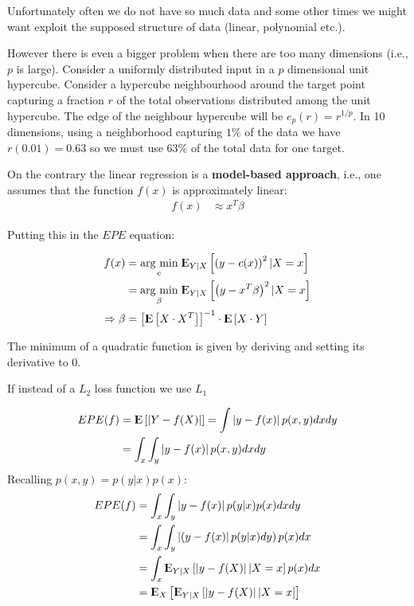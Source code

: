 \documentclass[12pt, letterpaper]{article}
\theoremstyle{definition}
\newcommand{\E}{{\rm I\kern-.3em E}}
\newcommand{\argmin}[1]{\underset{#1}{\operatorname{arg}\,\operatorname{min}}\;}
\begin{document}
Unfortunately often we do not have so much data and some other times we might want exploit the supposed structure of data (linear, polynomial etc.).

However there is even a bigger problem when there are too many dimensions (i.e., $p$ is large). Consider a uniformly distributed input in a $p$ dimensional unit hypercube. Consider a hypercube neighbourhood around the target point capturing a fraction $r$ of the total observations distributed among the unit hypercube. The edge of the neighbour hypercube will be $e_p(r) = r^{1/p}$. In 10 dimensions, using a neighborhood capturing $1\%$ of the data we have $r(0.01) = 0.63$ so we must use 63\% of the total data for one target.

On the contrary the linear regression is a \textbf{model-based approach}, i.e., one assumes that the function $f(x)$ is approximately linear:
\begin{align}
f(x) &\approx x^T \beta
\end{align}

Putting this in the $EPE$ equation:

\begin{equation}
\begin{aligned}
f(x) &= \argmin{c} \E_{Y|X} \left[ \left( y - c(x) \right)^2 | X=x \right]  \\
&= \argmin{\beta} \E_{Y|X} \left[ \left( y - x^T \beta \right)^2 | X=x \right] \\
\Rightarrow \beta &= \left[ \E\left[ X\cdot X ^T\right]\right]^{-1} \cdot \E\left[ X\cdot Y \right]
\end{aligned}
\end{equation}

The minimum of a quadratic function is given by deriving and setting its derivative to $0$.

If instead of a $L_2$ loss function we use $L_1$

\begin{equation}
\begin{aligned}
EPE(f) &= \E\left[ \left| Y- f(X) \right| \right] = \int \left| y- f(x) \right| p(x,y) dx dy \\
&= \int_x\int_y \left| y- f(x) \right|p(x,y) dx dy \\
\end{aligned}
\end{equation}
Recalling $p(x,y) = p( y|x) p(x)$:
\begin{equation}
\begin{aligned}
EPE(f) &= \int_x\int_y \left| y- f(x) \right|p(y|x)  p(x) dx dy \\
 &= \int_x \int_y \left| \left( y - f(x) \right| p(y|x) dy\right)  p(x) dx   \\
 &= \int_x \E_{Y|X} \left[ \left| y - f(X) \right| | X=x \right]  p(x) dx   \\
 &= \E_X \left[ \E_{Y|X} \left[ \left| y - f(X) \right| | X=x \right]    \right]   
\end{aligned}
\end{equation}
\end{document}
